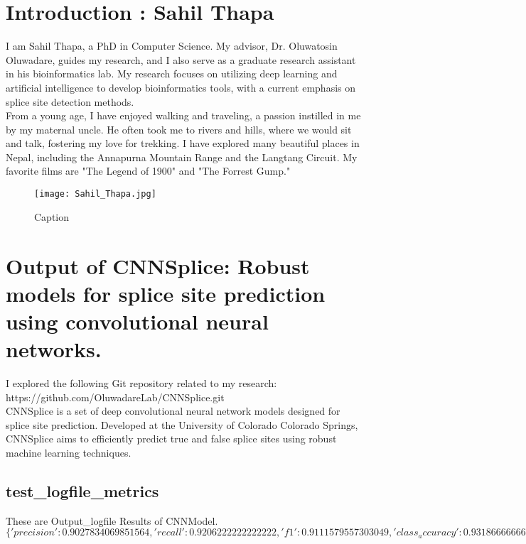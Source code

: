 

\section{Introduction : Sahil Thapa}
I am Sahil Thapa, a PhD in Computer Science. My advisor, Dr. Oluwatosin Oluwadare, guides my research, and I also serve as a graduate research assistant in his bioinformatics lab. My research focuses on utilizing deep learning and artificial intelligence to develop bioinformatics tools, with a current emphasis on splice site detection methods.\\

From a young age, I have enjoyed walking and traveling, a passion instilled in me by my maternal uncle. He often took me to rivers and hills, where we would sit and talk, fostering my love for trekking. I have explored many beautiful places in Nepal, including the Annapurna Mountain Range and the Langtang Circuit. My favorite films are "The Legend of 1900" and "The Forrest Gump."

\begin{figure}[h!]
    \centering
    \texttt{[image: Sahil\_Thapa.jpg]}
    \caption{Caption}
    \label{fig:enter-label}
\end{figure}

\section{Output of CNNSplice: Robust models for splice site prediction using convolutional neural networks.}
I explored the following Git repository related to my research: https://github.com/OluwadareLab/CNNSplice.git\\

CNNSplice is a set of deep convolutional neural network models designed for splice site prediction. Developed at the University of Colorado Colorado Springs, CNNSplice aims to efficiently predict true and false splice sites using robust machine learning techniques.

\subsection{test\_logfile\_metrics}
These are Output\_logfile Results of CNNModel.\\
$\{'precision': 0.9027834069851564, 'recall': 0.9206222222222222, 'f1': 0.9111579557303049, 'class_accuracy': 0.9318666666666666, 'accuracy': 0.9318666458129883\}$\\

